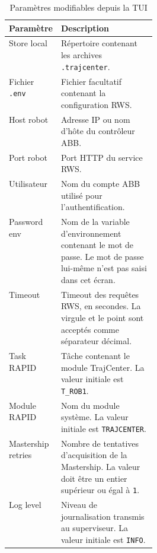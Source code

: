 \documentclass{rapportENSAM}
\begin{document}
\begin{table}[ht]
    \centering
    \small
    \begin{tabularx}{\linewidth}{
        |p{0.29\linewidth}
        |X|
    }
        \hline
        \textbf{Paramètre} &
        \textbf{Description} \\
        \hline

        Store local &
        Répertoire contenant les archives \texttt{.trajcenter}. \\
        \hline

        Fichier \texttt{.env} &
        Fichier facultatif contenant la configuration RWS. \\
        \hline

        Host robot &
        Adresse IP ou nom d'hôte du contrôleur ABB. \\
        \hline

        Port robot &
        Port HTTP du service RWS. \\
        \hline

        Utilisateur &
        Nom du compte ABB utilisé pour l'authentification. \\
        \hline

        Password env &
        Nom de la variable d'environnement contenant le mot de passe. Le mot
        de passe lui-même n'est pas saisi dans cet écran. \\
        \hline

        Timeout &
        Timeout des requêtes RWS, en secondes. La virgule et le point sont
        acceptés comme séparateur décimal. \\
        \hline

        Task RAPID &
        Tâche contenant le module TrajCenter. La valeur initiale est
        \texttt{T\_ROB1}. \\
        \hline

        Module RAPID &
        Nom du module système. La valeur initiale est
        \texttt{TRAJCENTER}. \\
        \hline

        Mastership retries &
        Nombre de tentatives d'acquisition de la Mastership. La valeur doit être un
        entier supérieur ou égal à \texttt{1}. \\
        \hline

        Log level &
        Niveau de journalisation transmis au superviseur. La valeur initiale
        est \texttt{INFO}. \\
        \hline
    \end{tabularx}
    \caption{Paramètres modifiables depuis la TUI}
    \label{tab:pc-tui-settings}
\end{table}
\end{document}
